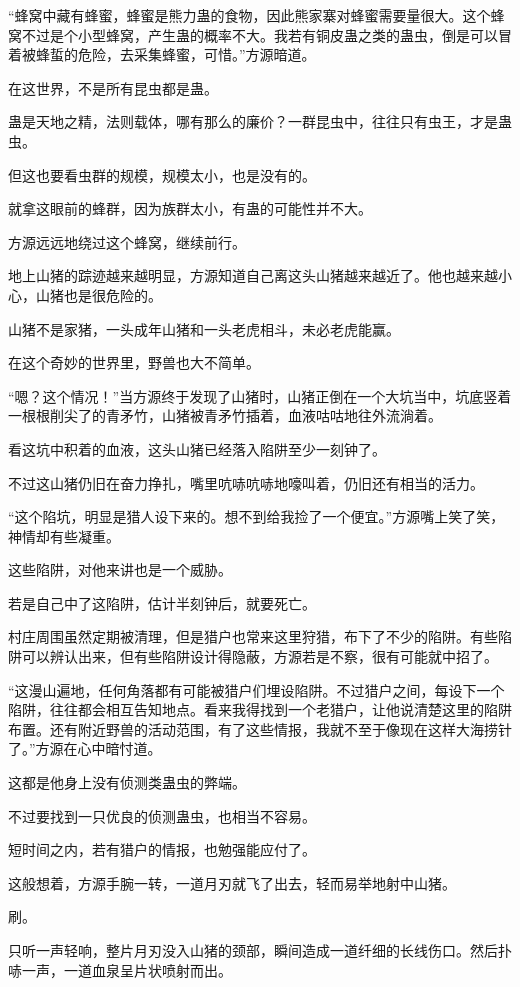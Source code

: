 \begin{this_body}
“蜂窝中藏有蜂蜜，蜂蜜是熊力蛊的食物，因此熊家寨对蜂蜜需要量很大。这个蜂窝不过是个小型蜂窝，产生蛊的概率不大。我若有铜皮蛊之类的蛊虫，倒是可以冒着被蜂蜇的危险，去采集蜂蜜，可惜。”方源暗道。

在这世界，不是所有昆虫都是蛊。

蛊是天地之精，法则载体，哪有那么的廉价？一群昆虫中，往往只有虫王，才是蛊虫。

但这也要看虫群的规模，规模太小，也是没有的。

就拿这眼前的蜂群，因为族群太小，有蛊的可能性并不大。

方源远远地绕过这个蜂窝，继续前行。

地上山猪的踪迹越来越明显，方源知道自己离这头山猪越来越近了。他也越来越小心，山猪也是很危险的。

山猪不是家猪，一头成年山猪和一头老虎相斗，未必老虎能赢。

在这个奇妙的世界里，野兽也大不简单。

“嗯？这个情况！”当方源终于发现了山猪时，山猪正倒在一个大坑当中，坑底竖着一根根削尖了的青矛竹，山猪被青矛竹插着，血液咕咕地往外流淌着。

看这坑中积着的血液，这头山猪已经落入陷阱至少一刻钟了。

不过这山猪仍旧在奋力挣扎，嘴里吭哧吭哧地嚎叫着，仍旧还有相当的活力。

“这个陷坑，明显是猎人设下来的。想不到给我捡了一个便宜。”方源嘴上笑了笑，神情却有些凝重。

这些陷阱，对他来讲也是一个威胁。

若是自己中了这陷阱，估计半刻钟后，就要死亡。

村庄周围虽然定期被清理，但是猎户也常来这里狩猎，布下了不少的陷阱。有些陷阱可以辨认出来，但有些陷阱设计得隐蔽，方源若是不察，很有可能就中招了。

“这漫山遍地，任何角落都有可能被猎户们埋设陷阱。不过猎户之间，每设下一个陷阱，往往都会相互告知地点。看来我得找到一个老猎户，让他说清楚这里的陷阱布置。还有附近野兽的活动范围，有了这些情报，我就不至于像现在这样大海捞针了。”方源在心中暗忖道。

这都是他身上没有侦测类蛊虫的弊端。

不过要找到一只优良的侦测蛊虫，也相当不容易。

短时间之内，若有猎户的情报，也勉强能应付了。

这般想着，方源手腕一转，一道月刃就飞了出去，轻而易举地射中山猪。

刷。

只听一声轻响，整片月刃没入山猪的颈部，瞬间造成一道纤细的长线伤口。然后扑哧一声，一道血泉呈片状喷射而出。


\end{this_body}
